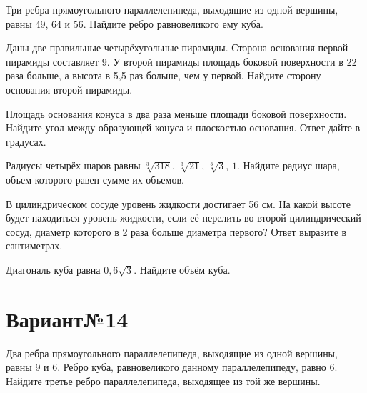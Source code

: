 \documentclass[4apaper]{article}
\begin{document}
\begin{taskBN}{1}
Три ребра прямоугольного параллелепипеда, выходящие из одной вершины, равны 49, 64 и 56. Найдите ребро равновеликого ему куба.
\end{taskBN}

\begin{taskBN}{2}
Даны две правильные четырёхугольные пирамиды. Сторона основания первой пирамиды составляет 9. У второй пирамиды площадь боковой поверхности в 22 раза больше, а высота в 5,5 раз больше, чем у первой. Найдите сторону основания второй пирамиды.
\end{taskBN}

\begin{taskBN}{3}
Площадь основания конуса в два раза меньше площади боковой поверхности. Найдите угол между образующей конуса и плоскостью основания. Ответ дайте в градусах.
\end{taskBN}

\begin{taskBN}{4}
Радиусы четырёх шаров равны $\sqrt[3]{318}$, $\sqrt[3]{21}$, $\sqrt[3]{3}$, $1$. Найдите радиус шара, объем которого равен сумме их объемов.
\end{taskBN}

\begin{taskBN}{5}
В цилиндрическом сосуде уровень жидкости достигает 56 см. На какой высоте будет находиться уровень жидкости, если её перелить во второй цилиндрический сосуд, диаметр которого в 2 раза больше диаметра первого? Ответ выразите в сантиметрах.
\end{taskBN}

\begin{taskBN}{6}
Диагональ куба равна $0,6\sqrt{3}$. Найдите объём куба.
\end{taskBN}
\newpage\section*{Вариант№14}

\begin{taskBN}{1}
Два ребра прямоугольного параллелепипеда, выходящие из одной вершины, равны 9 и 6. Ребро куба, равновеликого данному параллелепипеду, равно 6. Найдите третье ребро параллелепипеда, выходящее из той же вершины.
\end{taskBN}
\end{document}
